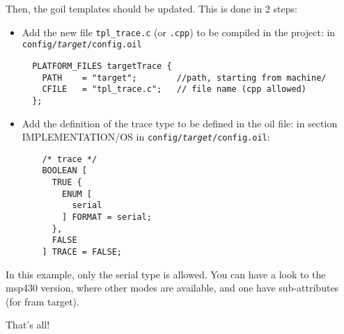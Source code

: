 Then, the goil templates should be updated. This is done in 2 steps:

\begin{itemize}
	\item Add the new file \texttt{tpl\_trace.c} (or \texttt{.cpp}) to be compiled in the project: in \texttt{config/\textit{target}/config.oil} \\
\begin{lstlisting}
  PLATFORM_FILES targetTrace {
    PATH    = "target";        //path, starting from machine/
    CFILE   = "tpl_trace.c";   // file name (cpp allowed)
  };
\end{lstlisting}

	\item Add the definition of the trace type to be defined in the oil file: in section IMPLEMENTATION/OS in \texttt{config/\textit{target}/config.oil}:
\begin{lstlisting}
    /* trace */
    BOOLEAN [
      TRUE {
        ENUM [
          serial
        ] FORMAT = serial;
      },
      FALSE
    ] TRACE = FALSE;
\end{lstlisting}
\end{itemize}

In this example, only the serial type is allowed. You can have a look to the msp430 version, where other modes are available, and one have sub-attributes (for fram target).

That's all!
